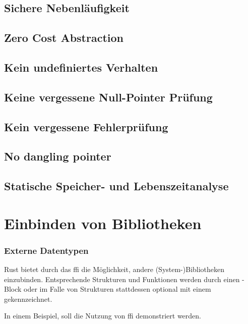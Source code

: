 \subsection{Sichere Nebenläufigkeit}
\subsection{Zero Cost Abstraction}
\subsection{Kein undefiniertes Verhalten}
\subsection{Keine vergessene Null-Pointer Prüfung}
\label{rust:no_null}
\subsection{Kein vergessene Fehlerprüfung}
\subsection{No dangling pointer}
\subsection{Statische Speicher- und Lebenszeitanalyse}


\section{Einbinden von Bibliotheken}

\subsubsection{Externe Datentypen}
\label{rust:ffi:datatypes}

Rust bietet durch das \gls{ffi} die Möglichkeit, andere (System-)Bibliotheken einzubinden.
Entsprechende Strukturen und Funktionen werden durch einen -Block
oder im Falle von Strukturen stattdessen optional mit einem \rustcinline{#[repr(C)]} gekennzeichnet.

In einem Beispiel, soll die Nutzung von \gls{ffi} demonstriert werden.

